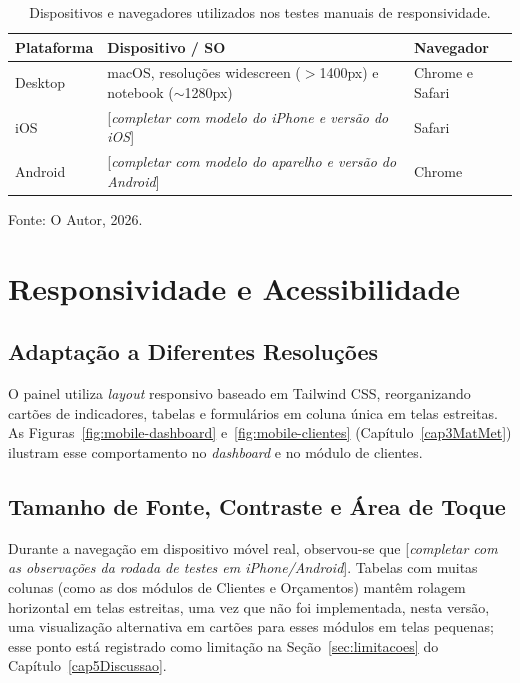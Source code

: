 \begin{table}[H]
  \centering
  \caption{Dispositivos e navegadores utilizados nos testes manuais de responsividade.}
  \label{tab:dispositivos-testados}
  \begin{tabular}{p{3cm}p{5.5cm}p{5.5cm}}
    \hline
    \textbf{Plataforma} & \textbf{Dispositivo / SO} & \textbf{Navegador} \\
    \hline
    Desktop & macOS, resoluções widescreen ($>$1400px) e notebook ($\sim$1280px) & Chrome e Safari \\
    iOS & [\textit{completar com modelo do iPhone e versão do iOS}] & Safari \\
    Android & [\textit{completar com modelo do aparelho e versão do Android}] & Chrome \\
    \hline
  \end{tabular}
  \begin{minipage}{0.95\textwidth}
    \vspace{0.3em}
    {\small Fonte: O Autor, 2026.}
  \end{minipage}
\end{table}

\section{Responsividade e Acessibilidade}

\subsection{Adaptação a Diferentes Resoluções}

O painel utiliza \textit{layout} responsivo baseado em Tailwind CSS, reorganizando cartões de indicadores, tabelas e formulários em coluna única em telas estreitas. As Figuras~\ref{fig:mobile-dashboard} e~\ref{fig:mobile-clientes} (Capítulo~\ref{cap3MatMet}) ilustram esse comportamento no \textit{dashboard} e no módulo de clientes.

\subsection{Tamanho de Fonte, Contraste e Área de Toque}

Durante a navegação em dispositivo móvel real, observou-se que [\textit{completar com as observações da rodada de testes em iPhone/Android}]. Tabelas com muitas colunas (como as dos módulos de Clientes e Orçamentos) mantêm rolagem horizontal em telas estreitas, uma vez que não foi implementada, nesta versão, uma visualização alternativa em cartões para esses módulos em telas pequenas; esse ponto está registrado como limitação na Seção~\ref{sec:limitacoes} do Capítulo~\ref{cap5Discussao}.

